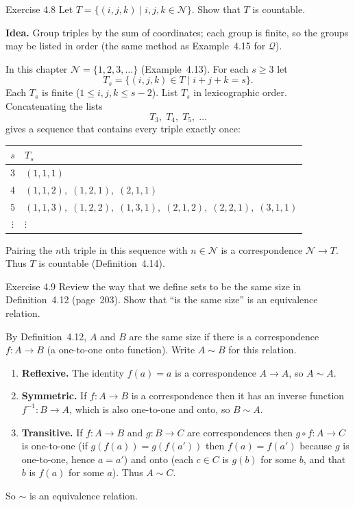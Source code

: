 \begin{question}{Exercise 4.8}
Let $T=\{(i,j,k)\mid i,j,k\in\mathcal{N}\}$. Show that $T$ is countable.
\end{question}
\begin{soln}
\textbf{Idea.} Group triples by the sum of coordinates; each group is finite, so the groups may be listed in order (the same method as Example~4.15 for $\mathcal{Q}$).

In this chapter $\mathcal{N}=\{1,2,3,\dots\}$ (Example~4.13). For each $s\ge 3$ let
\[
T_s=\{(i,j,k)\in T\mid i+j+k=s\}.
\]
Each $T_s$ is finite ($1\le i,j,k\le s-2$). List $T_s$ in lexicographic order. Concatenating the lists
\[
T_3,\;T_4,\;T_5,\;\dots
\]
gives a sequence that contains every triple exactly once:
\begin{center}
\begin{tabular}{@{}cl@{}}
\toprule
$s$ & $T_s$ \\
\midrule
$3$ & $(1,1,1)$ \\
$4$ & $(1,1,2),\;(1,2,1),\;(2,1,1)$ \\
$5$ & $(1,1,3),\;(1,2,2),\;(1,3,1),\;(2,1,2),\;(2,2,1),\;(3,1,1)$ \\
$\vdots$ & $\vdots$ \\
\bottomrule
\end{tabular}
\end{center}
Pairing the $n$th triple in this sequence with $n\in\mathcal{N}$ is a correspondence $\mathcal{N}\to T$. Thus $T$ is countable (Definition~4.14).
\end{soln}

\begin{question}{Exercise 4.9}
Review the way that we define sets to be the same size in Definition~4.12 (page~203). Show that ``is the same size'' is an equivalence relation.
\end{question}
\begin{soln}
By Definition~4.12, $A$ and $B$ are the same size if there is a correspondence $f:A\to B$ (a one-to-one onto function). Write $A\sim B$ for this relation.
\begin{enumerate}
\item \textbf{Reflexive.} The identity $f(a)=a$ is a correspondence $A\to A$, so $A\sim A$.
\item \textbf{Symmetric.} If $f:A\to B$ is a correspondence then it has an inverse function $f^{-1}:B\to A$, which is also one-to-one and onto, so $B\sim A$.
\item \textbf{Transitive.} If $f:A\to B$ and $g:B\to C$ are correspondences then $g\circ f:A\to C$ is one-to-one (if $g(f(a))=g(f(a'))$ then $f(a)=f(a')$ because $g$ is one-to-one, hence $a=a'$) and onto (each $c\in C$ is $g(b)$ for some $b$, and that $b$ is $f(a)$ for some $a$). Thus $A\sim C$.
\end{enumerate}
So $\sim$ is an equivalence relation.
\end{soln}

